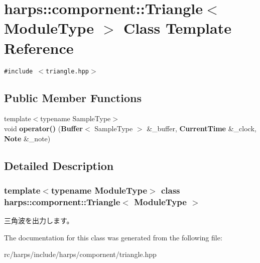 \section{harps::compornent::Triangle$<$ ModuleType $>$ Class Template Reference}
\label{classharps_1_1compornent_1_1Triangle}
{\tt \#include $<$triangle.hpp$>$}

\subsection*{Public Member Functions}
\begin{CompactItemize}
\item 
{\footnotesize template$<$typename SampleType$>$ }\\void \textbf{operator()} ({\bf Buffer}$<$ SampleType $>$ \&\_\-buffer, {\bf CurrentTime} \&\_\-clock, {\bf Note} \&\_\-note)\label{classharps_1_1compornent_1_1Triangle_48e13276ac76e05e17e3232064152865}

\end{CompactItemize}


\subsection{Detailed Description}
\subsubsection*{template$<$typename ModuleType$>$ class harps::compornent::Triangle$<$ ModuleType $>$}

三角波を出力します。 

The documentation for this class was generated from the following file:\begin{CompactItemize}
\item 
rc/harps/include/harps/compornent/triangle.hpp\end{CompactItemize}
